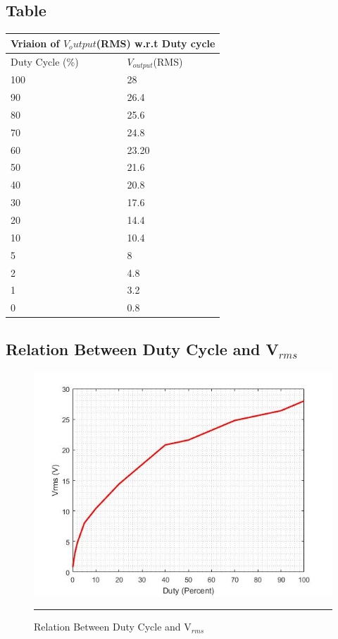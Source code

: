 \subsection{Table }
\begin{center}
	\begin{tabular}{ |p{4cm}||p{4cm}|  }
		\hline
		\multicolumn{2}{|c|}{Vriaion of $V_output$(RMS) w.r.t Duty cycle} \\
		\hline
		Duty Cycle (\%) & $V_{output}$(RMS)\\
		\hline
		100 & 28 \\
		\hline
        90 & 26.4\\
        \hline
        80 & 25.6 \\
        \hline
        70 & 24.8 \\
        \hline
        60 & 23.20 \\
        \hline
        50 & 21.6 \\
        \hline
        40 & 20.8 \\
        \hline
        30 & 17.6 \\
        \hline	
        20 & 14.4 \\
        \hline	
        10 & 10.4 \\
        \hline
        5 & 8 \\
        \hline
        2 & 4.8 \\
        \hline
        1 & 3.2 \\
        \hline
        0 & 0.8 \\
        \hline
	\end{tabular}
\end{center}

\subsection{Relation Between Duty Cycle and V$_{rms}$}
\begin{figure}[htbp]
	\centering
	\includegraphics[width = 5in]{./Figures/p_d_v}
	\rule{35em}{1pt}
	\caption{Relation Between Duty Cycle and V$_{rms}$}
\end{figure}

